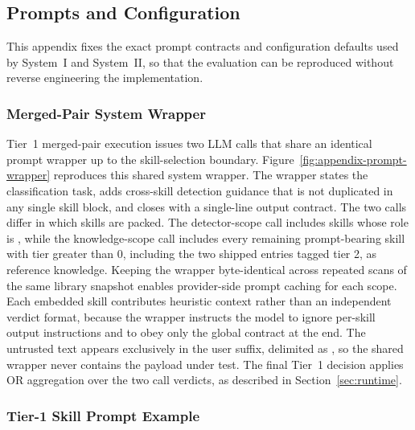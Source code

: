 \subsection{Prompts and Configuration}
\label{app:prompts-config}

This appendix fixes the exact prompt contracts and configuration defaults
used by System~I and System~II, so that the evaluation can be reproduced
without reverse engineering the implementation.



\subsubsection{Merged-Pair System Wrapper}
\label{app:prompts-wrapper}



Tier~1 merged-pair execution issues two LLM calls that share an identical
prompt wrapper up to the skill-selection boundary.
Figure~\ref{fig:appendix-prompt-wrapper} reproduces this shared system
wrapper.
The wrapper states the classification task, adds cross-skill
detection guidance that is not duplicated in any single skill block, and
closes with a single-line output contract.
The two calls differ in which skills are packed.
The detector-scope call includes skills whose role is ,
while the knowledge-scope call includes every remaining prompt-bearing
skill with tier greater than 0, including the two shipped entries tagged
tier 2, as reference knowledge.
Keeping the wrapper byte-identical across repeated scans of the same
library snapshot enables provider-side prompt caching for each scope.
Each embedded skill contributes heuristic context rather than an
independent verdict format, because the wrapper instructs the model to
ignore per-skill output instructions and to obey only the global contract
at the end.
The untrusted text appears exclusively in the user suffix, delimited as
, so the shared wrapper never contains
the payload under test.
The final Tier~1 decision applies OR aggregation over the two call
verdicts, as described in Section~\ref{sec:runtime}.

\subsubsection{Tier-1 Skill Prompt Example}
\label{app:prompts-skill}



